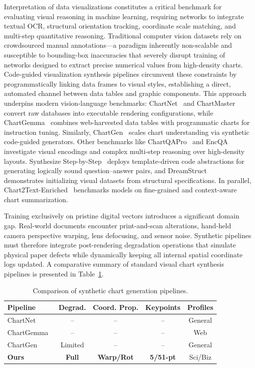 \documentclass[11pt,twocolumn]{article}
\begin{document}
Interpretation of data visualizations constitutes a critical benchmark for evaluating visual reasoning in machine learning, requiring networks to integrate textual OCR, structural orientation tracking, coordinate scale matching, and multi-step quantitative reasoning.
Traditional computer vision datasets rely on crowdsourced manual annotations---a paradigm inherently non-scalable and susceptible to bounding-box inaccuracies that severely disrupt training of networks designed to extract precise numerical values from high-density charts.
Code-guided visualization synthesis pipelines circumvent these constraints by programmatically linking data frames to visual styles, establishing a direct, automated channel between data tables and graphic components.
This approach underpins modern vision-language benchmarks: ChartNet~\cite{kondic2026chartnet} and ChartMaster~\cite{liu2026chartmaster} convert raw databases into executable rendering configurations, while ChartGemma~\cite{masry2024chartgemma} combines web-harvested data tables with programmatic charts for instruction tuning.
Similarly, ChartGen~\cite{kondic2025chartgen} scales chart understanding via synthetic code-guided generators. Other benchmarks like ChartQAPro~\cite{masry2025chartqapro} and EncQA~\cite{han2026encqa} investigate visual encodings and complex multi-step reasoning over high-density layouts.
Synthesize Step-by-Step~\cite{li2024synthesize} deploys template-driven code abstractions for generating logically sound question--answer pairs, and DreamStruct~\cite{peng2024dreamstruct} demonstrates initializing visual datasets from structural specifications.
In parallel, Chart2Text-Enriched~\cite{suh2025chart2text} benchmarks models on fine-grained and context-aware chart summarization.

Training exclusively on pristine digital vectors introduces a significant domain gap.
Real-world documents encounter print-and-scan alterations, hand-held camera perspective warping, lens defocusing, and sensor noise.
Synthetic pipelines must therefore integrate post-rendering degradation operations that simulate physical paper defects while dynamically keeping all internal spatial coordinate logs updated. 
A comparative summary of standard visual chart synthesis pipelines is presented in Table~\ref{tab:pipeline_comparison}.

\begin{table}[htbp]
\centering
\caption{Comparison of synthetic chart generation pipelines.}\label{tab:pipeline_comparison}
\small
\begin{tabularx}{\columnwidth}{l c c c c}
\toprule
\textbf{Pipeline} & \textbf{Degrad.} & \textbf{Coord. Prop.} & \textbf{Keypoints} & \textbf{Profiles} \\
\midrule
ChartNet~\cite{kondic2026chartnet} & -- & -- & -- & General \\
ChartGemma~\cite{masry2024chartgemma} & -- & -- & -- & Web \\
ChartGen~\cite{kondic2025chartgen} & Limited & -- & -- & General \\
\textbf{Ours} & \textbf{Full} & \textbf{Warp/Rot} & \textbf{5/51-pt} & Sci/Biz \\
\bottomrule
\end{tabularx}
\end{table}
\end{document}
